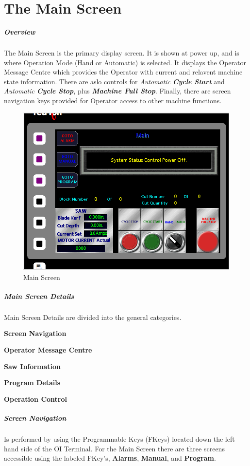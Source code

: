 \chapter{The Main Screen}
\paragraph{Overview}
The Main Screen is the primary display screen. It is shown at power up, and is where Operation Mode (Hand or Automatic) is selected. It displays the Operator Message Centre which provides the Operator with current and relavent machine state information. There are aslo controls for \textit{Automatic \textbf{Cycle Start}} and \textit{Automatic \textbf{Cycle Stop}}, plus \textbf{\textit{Machine Full Stop}}. Finally, there are screen navigation keys provided for Operator access to other machine functions.
\begin{figure}
	\centering
	\includegraphics[width=0.5\linewidth]{screen-captures/main-screen}
	\caption{Main Screen}
	\label{fig:main-screen}
\end{figure}
\pagebreak
\paragraph{Main Screen Details}
Main Screen Details are divided into the general categories.
\begin{list}{-}{}
	\item \textbf{Screen Navigation}
	\item \textbf{Operator Message Centre}
	\item \textbf{Saw Information}
	\item \textbf{Program Details}
	\item \textbf{Operation Control}
\end{list}
\paragraph{Screen Navigation}Is performed by using the Programmable Keys (FKeys) located down the left hand side of the OI Terminal. For the Main Screen there are three screens accessible using the labeled FKey's, \textbf{Alarms}, \textbf{Manual}, and \textbf{Program}.
